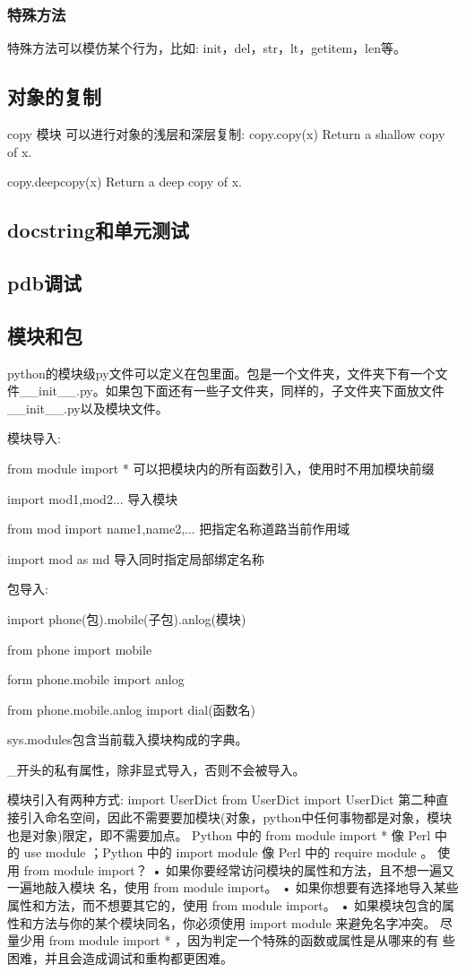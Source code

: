 \documentclass[twoside,11pt]{book}
\begin{document}
\subsubsection{特殊方法}
特殊方法可以模仿某个行为，比如:
init，del，str，lt，getitem，len等。

\subsection{对象的复制}
copy 模块
可以进行对象的浅层和深层复制:
copy.copy(x)
Return a shallow copy of x.

copy.deepcopy(x)
Return a deep copy of x.

\subsection{docstring和单元测试}

\subsection{pdb调试}


\subsection{模块和包}

python的模块级py文件可以定义在包里面。包是一个文件夹，文件夹下有一个文件\_\_init\_\_.py。如果包下面还有一些子文件夹，同样的，子文件夹下面放文件\_\_init\_\_.py以及模块文件。

模块导入:

from module import * 可以把模块内的所有函数引入，使用时不用加模块前缀

import mod1,mod2... 导入模块

from mod import name1,name2,... 把指定名称道路当前作用域

import mod as md 导入同时指定局部绑定名称

包导入:

import phone(包).mobile(子包).anlog(模块)

from phone import mobile

form phone.mobile import anlog

from phone.mobile.anlog import dial(函数名)


sys.modules包含当前载入摸块构成的字典。

\_开头的私有属性，除非显式导入，否则不会被导入。

模块引入有两种方式:
import UserDict
from UserDict import UserDict
第二种直接引入命名空间，因此不需要要加模块(对象，python中任何事物都是对象，模块也是对象)限定，即不需要加点。
Python 中的 from module import * 像 Perl 中的 use module ；Python 中的 import module 像 Perl 中的 require module 。
使用 from module import？
• 如果你要经常访问模块的属性和方法，且不想一遍又一遍地敲入模块 名，使用 from module import。
• 如果你想要有选择地导入某些属性和方法，而不想要其它的，使用 from
module import。
• 如果模块包含的属性和方法与你的某个模块同名，你必须使用 import
module 来避免名字冲突。
尽量少用 from module import * ，因为判定一个特殊的函数或属性是从哪来的有 些困难，并且会造成调试和重构都更困难。
\end{document}
